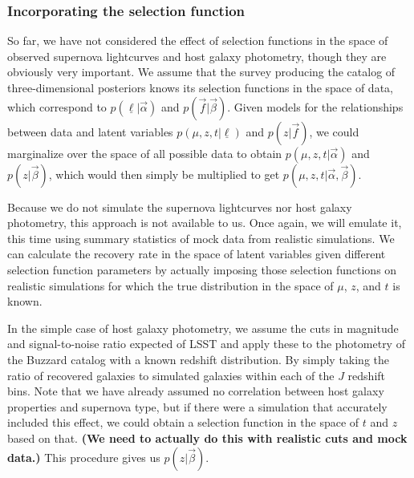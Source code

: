 \documentclass[12pt, onecolumn]{emulateapj}
\newcommand{\textul}{\underline}
\begin{document}
\subsubsection{Incorporating the selection function}
\label{sec:selectionfunctions}

So far, we have not considered the effect of selection functions in the space of observed supernova lightcurves and host galaxy photometry, though they are obviously very important.  We assume that the survey producing the catalog of three-dimensional posteriors knows its selection functions in the space of data, which correspond to $p(\textul{\ell} | \vec{\alpha})$ and $p(\vec{f} | \vec{\beta})$.  Given models for the relationships between data and latent variables $p(\mu, z, t | \textul{\ell})$ and $p(z | \vec{f})$, we could marginalize over the space of all possible data to obtain $p(\mu, z, t | \vec{\alpha})$ and $p(z | \vec{\beta})$, which would then simply be multiplied to get $p(\mu, z, t | \vec{\alpha}, \vec{\beta})$.  

Because we do not simulate the supernova lightcurves nor host galaxy photometry, this approach is not available to us.  Once again, we will emulate it, this time using summary statistics of mock data from realistic simulations.  We can calculate the recovery rate in the space of latent variables given different selection function parameters by actually imposing those selection functions on realistic simulations for which the true distribution in the space of $\mu$, $z$, and $t$ is known. 

In the simple case of host galaxy photometry, we assume the cuts in magnitude and signal-to-noise ratio expected of LSST and apply these to the photometry of the Buzzard catalog with a known redshift distribution.  By simply taking the ratio of recovered galaxies to simulated galaxies within each of the $J$ redshift bins.  Note that we have already assumed no correlation between host galaxy properties and supernova type, but if there were a simulation that accurately included this effect, we could obtain a selection function in the space of $t$ and $z$ based on that.  \textbf{(We need to actually do this with realistic cuts and mock data.)}  This procedure gives us $p(z | \vec{\beta})$.
\end{document}
